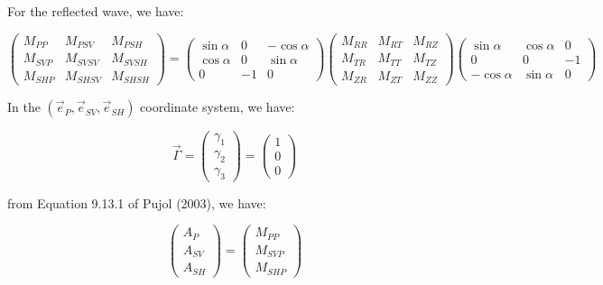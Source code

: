 \documentclass[main.tex]{subfiles}
\begin{document}
For the reflected wave, we have:

\begin{equation}
\begin{pmatrix}
M_{PP} & M_{PSV} & M_{PSH} \\
M_{SVP} & M_{SVSV} & M_{SVSH} \\
M_{SHP} & M_{SHSV} & M_{SHSH}
\end{pmatrix} = \begin{pmatrix}
\sin \alpha & 0 & - \cos \alpha \\
\cos \alpha & 0 & \sin \alpha \\
0 & - 1 & 0
\end{pmatrix} \begin{pmatrix}
M_{RR} & M_{RT} & M_{RZ} \\
M_{TR} & M_{TT} & M_{TZ} \\
M_{ZR} & M_{ZT} & M_{ZZ}
\end{pmatrix} \begin{pmatrix}
\sin \alpha & \cos \alpha & 0 \\
0 & 0 & - 1 \\
- \cos \alpha & \sin \alpha & 0
\end{pmatrix}
\end{equation}

In the $(\vec{e}_P, \vec{e}_{SV}, \vec{e}_{SH})$ coordinate system, we have:

\begin{equation}
\vec{\Gamma} = \begin{pmatrix}
\gamma_1 \\
\gamma_2 \\
\gamma_3
\end{pmatrix} = \begin{pmatrix}
1 \\
0 \\
0
\end{pmatrix}
\end{equation}

from Equation 9.13.1 of Pujol (2003), we have:

\begin{equation}
\begin{pmatrix}
A_P \\
A_{SV} \\
A_{SH}
\end{pmatrix} =\begin{pmatrix}
M_{PP} \\
M_{SVP} \\
M_{SHP}
\end{pmatrix}
\end{equation}
\end{document}
